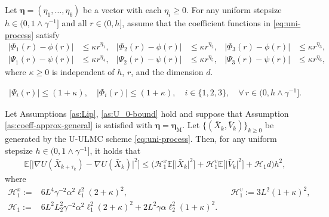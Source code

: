 \documentclass[10pt,a4paper]{amsart}
\renewcommand{\H}{\mathcal{H}}
\begin{document}
\begin{assumption}
\label{as:coeff-approx-general}
Let \(\boldsymbol{\eta}=(\eta_1,\dots,\eta_6)\) be a vector with each \(\eta_i\ge 0\).
For any uniform stepsize
\(h\in(0,1\wedge\gamma^{-1}]\) and all \(r\in(0,h]\), assume that the coefficient functions in \eqref{eq:uni-process} satisfy
\begin{equation}
\label{eq:general-coeff-approx}
\begin{aligned}
|\Phi_1(r)-\phi(r)|
&\leq \kappa r^{\eta_1},
&
|\Phi_2(r)-\phi(r)|
&\leq \kappa r^{\eta_2},
&
|\Phi_3(r)-\phi(r)|
&\leq \kappa r^{\eta_3},
\\
|\Psi_1(r)-\psi(r)|
&\leq \kappa r^{\eta_4},
&
|\Psi_2(r)-\psi(r)|
&\leq \kappa r^{\eta_5},
&
|\Psi_3(r)-\psi(r)|
&\leq \kappa r^{\eta_6},
\end{aligned}
\end{equation}
where \(\kappa\geq0\) is independent of \(h\), \(r\), and the dimension $d$.

\end{assumption}

\begin{align}\label{eq:bound-Psi-Phi}
    |\Psi_i(r)|\leq (1+\kappa),
    \quad |\Phi_i(r)| \leq (1+\kappa), \quad  i \in 
    \{1,2,3\},
    \quad \forall \, r\in(0,h\wedge\gamma^{-1}].
\end{align}

\begin{lem}\label{lem:nabla-tau-delta}
Let Assumptions \ref{as:Lip}, \ref{as:U_0-bound} hold and suppose that Assumption \ref{as:coeff-approx-general} is satisfied with $\boldsymbol{\eta}=\boldsymbol{\eta}_{\mathrm M}$. Let $\{(\bar{X}_k,\bar{V}_k)\}_{k\geq0}$ be generated by the U-ULMC scheme \eqref{eq:uni-process}. Then, for any uniform stepsize $h\in(0,1\wedge\gamma^{-1}]$, it holds that 
\begin{equation}
\begin{aligned}
  \mathbb{E}
\Big[\big|
\nabla U(\bar{X}_{k+\tau_k})
-
\nabla U(\bar{X}_{k})
\big|^2\Big]  
\leq   
\Big( 
\H^{x}_1
\mathbb{E}
\Big[\big|
\bar{X}_k
\big|^2\Big]
+
\H^{v}_1
\mathbb{E}
\Big[\big|
\bar{V}_k
\big|^2\Big]
+
\H_1
d
\Big)h^2,
\end{aligned}
\end{equation}
where 
\begin{equation}
\begin{aligned}
\H^{x}_1
:=   &
6L^4
\gamma^{-2}
\alpha^2
\ell_1^2
(2 +  \kappa)^2,
& &
\H^{v}_1
:=   
3L^2(1+\kappa)^2,
\\
\H_1
:=   &
6L^2L_2^2
\gamma^{-2}
\alpha^2
\ell_1^2
(2 +  \kappa)^2
+
2L^2
\gamma\alpha\ell_2^2(1+\kappa)^2.
\end{aligned}
\end{equation}
\end{lem}
\end{document}
